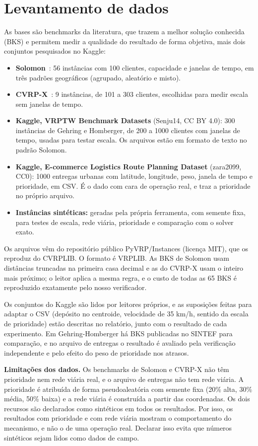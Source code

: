 \documentclass[12pt]{article}
\begin{document}
\section{Levantamento de dados}

As bases são benchmarks da literatura, que trazem a melhor solução conhecida (BKS) e permitem medir a qualidade do resultado de forma objetiva, mais dois conjuntos pesquisados no Kaggle:
\begin{itemize}
  \item \textbf{Solomon}~\cite{solomon1987}: 56 instâncias com 100 clientes, capacidade e janelas de tempo, em três padrões geográficos (agrupado, aleatório e misto).
  \item \textbf{CVRP-X}~\cite{uchoa2017}: 9 instâncias, de 101 a 303 clientes, escolhidas para medir escala sem janelas de tempo.
  \item \textbf{Kaggle, VRPTW Benchmark Datasets} (Senju14, CC BY 4.0): 300 instâncias de Gehring e Homberger, de 200 a 1000 clientes com janelas de tempo, usadas para testar escala. Os arquivos estão em formato de texto no padrão Solomon.
  \item \textbf{Kaggle, E-commerce Logistics Route Planning Dataset} (zara2099, CC0): 1000 entregas urbanas com latitude, longitude, peso, janela de tempo e prioridade, em CSV. É o dado com cara de operação real, e traz a prioridade no próprio arquivo.
  \item \textbf{Instâncias sintéticas:} geradas pela própria ferramenta, com semente fixa, para testes de escala, rede viária, prioridade e comparação com o solver exato.
\end{itemize}
Os arquivos vêm do repositório público PyVRP/Instances (licença MIT), que os reproduz do CVRPLIB. O formato é VRPLIB. As BKS de Solomon usam distâncias truncadas na primeira casa decimal e as do CVRP-X usam o inteiro mais próximo; o leitor aplica a mesma regra, e o custo de todas as 65 BKS é reproduzido exatamente pelo nosso verificador.

Os conjuntos do Kaggle são lidos por leitores próprios, e as suposições feitas para adaptar o CSV (depósito no centroide, velocidade de 35 km/h, sentido da escala de prioridade) estão descritas no relatório, junto com o resultado de cada experimento. Em Gehring-Homberger há BKS publicadas no SINTEF para comparação, e no arquivo de entregas o resultado é avaliado pela verificação independente e pelo efeito do peso de prioridade nos atrasos.

\textbf{Limitações dos dados.} Os benchmarks de Solomon e CVRP-X não têm prioridade nem rede viária real, e o arquivo de entregas não tem rede viária. A prioridade é atribuída de forma pseudoaleatória com semente fixa (20\% alta, 30\% média, 50\% baixa) e a rede viária é construída a partir das coordenadas. Os dois recursos são declarados como sintéticos em todos os resultados. Por isso, os resultados com prioridade e com rede viária mostram o comportamento do mecanismo, e não o de uma operação real. Declarar isso evita que números sintéticos sejam lidos como dados de campo.
\end{document}
